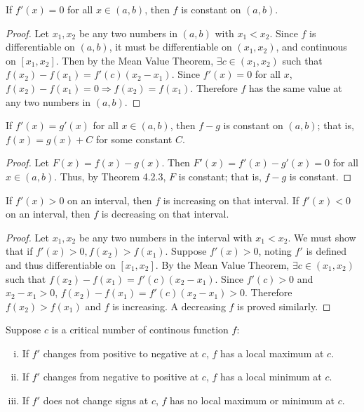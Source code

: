 \documentclass[a4paper,8pt]{article}
\begin{document}
\begin{outline}
    If \(f'(x) = 0\) for all \(x \in (a, b)\), then \(f\) is constant on \((a, b)\).

    \begin{proof}
      Let \(x_1, x_2\) be any two numbers in \((a, b)\) with \(x_1 < x_2\). Since \(f\) is differentiable on
      \((a, b)\), it must be differentiable on \((x_1, x_2)\), and continuous on \([x_1, x_2]\). Then by
      the Mean Value Theorem, \(\exists c \in (x_1, x_2)\) such that \(f(x_2)-f(x_1) = f'(c)(x_2-x_1)\).
      Since \(f'(x) = 0\) for all \(x\), \(f(x_2) - f(x_1) = 0 \Rightarrow f(x_2) = f(x_1)\). Therefore
      \(f\) has the same value at any two numbers in \((a, b)\).
    \end{proof}

    If \(f'(x) = g'(x)\) for all \(x \in (a, b)\), then \(f-g\) is constant on \((a, b)\); that is, \(f(x)=g(x)+C\)
    for some constant \(C\).

    \begin{proof}
      Let \(F(x) = f(x)-g(x)\). Then \(F'(x) = f'(x)-g'(x) = 0\) for all \(x \in (a, b)\). Thus, by Theorem 4.2.3,
      \(F\) is constant; that is, \(f-g\) is constant.
    \end{proof}

    If \(f'(x) > 0\) on an interval, then \(f\) is increasing on that interval. If \(f'(x) < 0\) on an interval,
    then \(f\) is decreasing on that interval.

    \begin{proof}
      Let \(x_1, x_2\) be any two numbers in the interval with \(x_1 < x_2\). We must show that if \(f'(x) > 0,
      f(x_2) > f(x_1)\). Suppose \(f'(x) > 0\), noting \(f'\) is defined and thus differentiable on \([x_1, x_2]\).
      By the Mean Value Theorem, \(\exists c \in (x_1, x_2)\) such that \(f(x_2)-f(x_1)=f'(c)(x_2-x_1)\). Since
      \(f'(c) > 0\) and \(x_2-x_1 > 0\), \(f(x_2)-f(x_1) = f'(c)(x_2-x_1) > 0\). Therefore \(f(x_2) > f(x_1)\)
      and \(f\) is increasing. A decreasing \(f\) is proved similarly.
    \end{proof}

    Suppose \(c\) is a critical number of continous function \(f\):
    \begin{enumerate}[i.]
      \item If \(f'\) changes from positive to negative at \(c\), \(f\) has a local maximum at \(c\).
      \item If \(f'\) changes from negative to positive at \(c\), \(f\) has a local minimum at \(c\).
      \item If \(f'\) does not change signs at \(c\), \(f\) has no local maximum or minimum at \(c\).
    \end{enumerate}


\end{outline}
\end{document}
